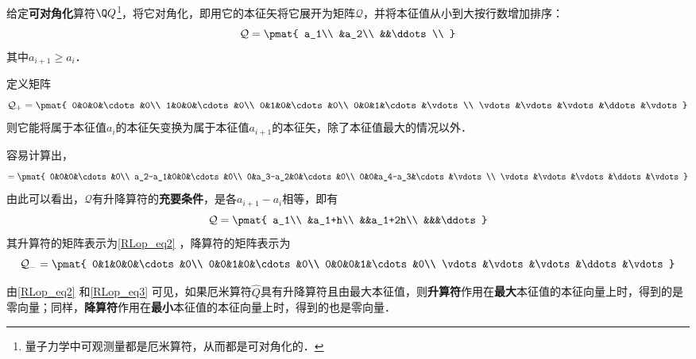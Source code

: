 给定\textbf{可对角化}算符$\Q Q$\footnote{量子力学中可观测量都是厄米算符，从而都是可对角化的．}，将它对角化，即用它的本征矢将它展开为矩阵$\mathcal{Q}$，并将本征值从小到大按行数增加排序：
\begin{equation}
\mathcal{Q}=
\pmat{
    a_1\\
    &a_2\\
    &&\ddots\\
}
\end{equation}
其中$a_{i+1}\geq a_i$．

定义矩阵
\begin{equation}\label{RLop_eq2}
\mathcal{Q}_+ = 
\pmat{
    0&0&0&\cdots&0\\
    1&0&0&\cdots&0\\
    0&1&0&\cdots&0\\
    0&0&1&\cdots&\vdots\\
    \vdots&\vdots&\vdots&\ddots&\vdots
}
\end{equation}
则它能将属于本征值$a_i$的本征矢变换为属于本征值$a_{i+1}$的本征矢，除了本征值最大的情况以外．

容易计算出，
\begin{equation}
[\mathcal{Q}, \mathcal{Q}_+]=
\pmat{
    0&0&0&\cdots&0\\
    a_2-a_1&0&0&\cdots&0\\
    0&a_3-a_2&0&\cdots&0\\
    0&0&a_4-a_3&\cdots&\vdots\\
    \vdots&\vdots&\vdots&\ddots&\vdots
}
\end{equation}
由此可以看出，$\mathcal{Q}$有升降算符的\textbf{充要条件}，是各$a_{i+1}-a_i$相等，即有
\begin{equation}
\mathcal{Q}=\pmat{
    a_1\\
    &a_1+h\\
    &&a_1+2h\\
    &&&\ddots
}
\end{equation}
其升算符的矩阵表示为\autoref{RLop_eq2} ，降算符的矩阵表示为
\begin{equation}\label{RLop_eq3}
\mathcal{Q}_- = 
\pmat{
    0&1&0&0&\cdots&0\\
    0&0&1&0&\cdots&0\\
    0&0&0&1&\cdots&0\\
    \vdots&\vdots&\vdots&\ddots&\vdots
}
\end{equation}

由\autoref{RLop_eq2} 和\autoref{RLop_eq3} 可见，如果厄米算符$\hat{Q}$具有升降算符且由最大本征值，则\textbf{升算符}作用在\textbf{最大}本征值的本征向量上时，得到的是零向量；同样，\textbf{降算符}作用在\textbf{最小}本征值的本征向量上时，得到的也是零向量．






